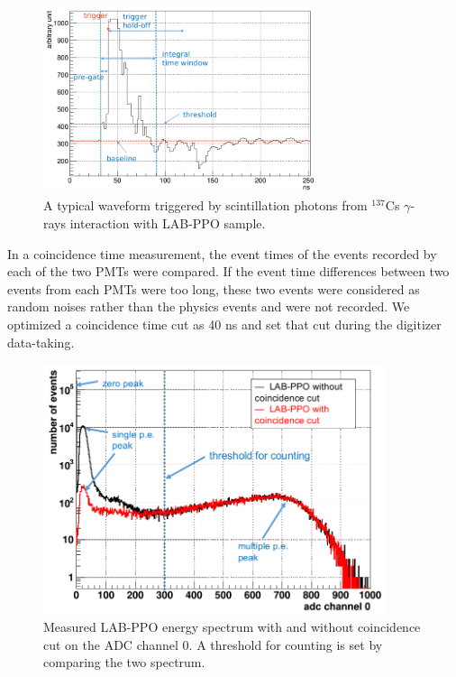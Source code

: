 \begin{figure}[htbp]
	\centering	
	\includegraphics[width=8cm]{teLS_waveform.png}
	\caption{A typical waveform triggered by scintillation photons from $^{137}$Cs $\gamma$-rays interaction with LAB-PPO sample.}
	\label{teLSwaveform}
\end{figure}

In a coincidence time measurement, the event times of the events recorded by each of the two PMTs were compared. If the event time differences between two events from each PMTs were too long, these two events were considered as random noises rather than the physics events and were not recorded. We optimized a coincidence time cut as 40 ns and set that cut during the digitizer data-taking. 

\begin{figure}[htbp]
	\centering	
	\includegraphics[width=10cm]{TeLScoinCut.png}
	\caption{Measured LAB-PPO energy spectrum with and without coincidence cut on the ADC channel 0.  A threshold for counting is set by comparing the two spectrum.}
	\label{teLScoinCut}
\end{figure}

